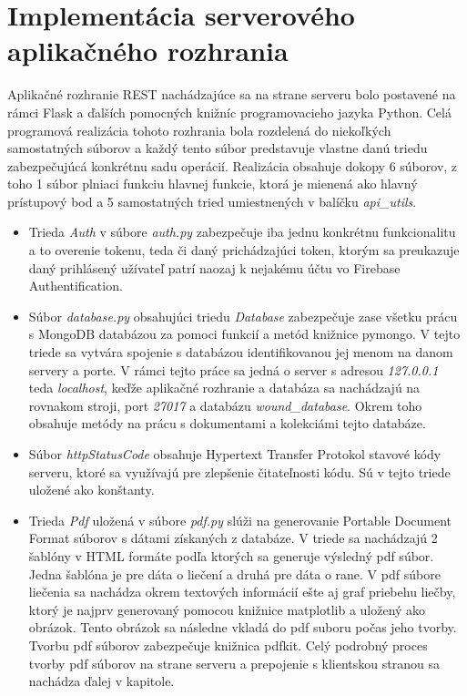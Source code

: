 \section{Implementácia serverového aplikačného rozhrania}
Aplikačné rozhranie REST nachádzajúce sa na strane serveru bolo postavené na rámci Flask a ďalších pomocných knižníc programovacieho jazyka Python. Celá programová realizácia tohoto rozhrania bola rozdelená do niekoľkých samostatných súborov a každý tento súbor predstavuje vlastne danú triedu zabezpečujúcá konkrétnu sadu operácií. Realizácia obsahuje dokopy 6 súborov, z toho 1 súbor plniaci funkciu hlavnej funkcie, ktorá je mienená ako hlavný prístupový bod a 5 samostatných tried umiestnených v balíčku \textit{api\_utils}.
\begin{itemize}
\item Trieda \textit{Auth} v súbore \textit{auth.py} zabezpečuje iba jednu konkrétnu funkcionalitu a to overenie tokenu, teda či daný prichádzajúci token, ktorým sa preukazuje daný prihlásený užívateľ patrí naozaj k nejakému účtu vo Firebase Authentification.

\item Súbor \textit{database.py} obsahujúci triedu \textit{Database} zabezpečuje zase všetku prácu s MongoDB databázou za pomoci funkcií a metód knižnice pymongo. V tejto triede sa vytvára spojenie s databázou identifikovanou jej menom na danom servery a porte. V rámci tejto práce sa jedná o server s adresou \textit{127.0.0.1} teda \textit{localhost}, keďže aplikačné rozhranie a databáza sa nachádzajú na rovnakom stroji, port \textit{27017} a databázu \textit{wound\_database}. Okrem toho obsahuje metódy na prácu s dokumentami a kolekciámi tejto databáze.

\item Súbor \textit{httpStatusCode} obsahuje Hypertext Transfer Protokol stavové kódy serveru, ktoré sa využívajú pre zlepšenie čitateľnosti kódu. Sú v tejto triede uložené ako konštanty.

\item Trieda \textit{Pdf} uložená v súbore \textit{pdf.py} slúži na generovanie Portable Document Format súborov s dátami získaných z databáze. V triede sa nachádzajú 2 šablóny v HTML  formáte podľa ktorých sa generuje výsledný pdf súbor. Jedna šablóna je pre dáta o liečení a druhá pre dáta o rane. V pdf súbore liečenia sa nachádza okrem textových informácií ešte aj graf priebehu liečby, ktorý je najprv generovaný pomocou knižnice matplotlib a uložený ako obrázok. Tento obrázok sa následne vkladá do pdf suboru počas jeho tvorby. Tvorbu pdf súborov zabezpečuje knižnica pdfkit. Celý podrobný proces tvorby pdf súborov na strane serveru a prepojenie s klientskou stranou sa nachádza ďalej v kapitole.


\end{itemize}
